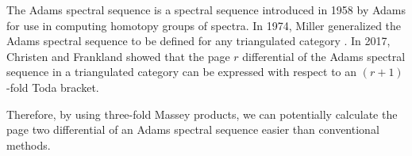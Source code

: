 The Adams spectral sequence is a spectral sequence introduced in 1958 by Adams for use in computing homotopy groups of spectra. In 1974, Miller generalized the Adams spectral sequence to be defined for any triangulated category \cite[Chapter I]{Miller_1975}. In 2017, Christen and Frankland \cite[Section 4, Section 6]{Christensen-Frankland_2017} showed that the page \( r \) differential of the Adams spectral sequence in a triangulated category can be expressed with respect to an \( (r + 1) \)-fold Toda bracket.

Therefore, by using three-fold Massey products, we can potentially calculate the page two differential of an Adams spectral sequence easier than conventional methods.
